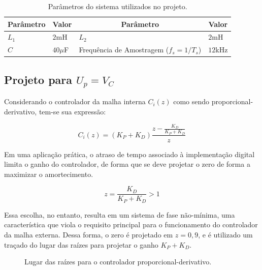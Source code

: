     \begin{table}[htb]
        \renewcommand{\arraystretch}{1.35}
        \setlength{\tabcolsep}{1.2mm}
        \caption{Parâmetros do sistema utilizados no projeto.}
        \label{tab:sim_parameters}
        \centering
        \begin{tabular}{l l l l}
            \hline
            \multicolumn{1}{c}{Parâmetro} & \multicolumn{1}{c}{Valor} &
            \multicolumn{1}{c}{Parâmetro} & \multicolumn{1}{c}{Valor} \\
            \hline
            $L_1$ &  $2$mH      &  $L_2$                                   &  $2$mH    \\
            $C$   &  $40\mu$F   & Frequência de Amostragem ($f_s = 1/T_s$) &  $12$kHz  \\
            \hline
        \end{tabular}
    \end{table}


\subsection{Projeto para $U_p = V_C$}

    Considerando o controlador da malha interna $C_i(z)$ como sendo proporcional-derivativo,
    tem-se sua expressão:

    \begin{equation}
        C_i(z) = \left( K_P + K_D \right) \frac{z- \frac{K_D}{K_P+K_D}}{z}
    \end{equation}

    Em uma aplicação prática, o atraso de tempo associado à implementação digital limita o
    ganho do controlador, de forma que se deve projetar o zero de forma a maximizar o amortecimento.

    \begin{equation*}
        z = \frac{K_D}{K_P+K_D} > 1
    \end{equation*}

    Essa escolha, no entanto, resulta em um sistema de fase não-mínima, uma característica
    que viola o requisito principal para o funcionamento do controlador da malha externa. Dessa
    forma, o zero é projetado em $z=0,9$, e é utilizado um traçado do lugar das raízes para projetar
    o ganho $K_P+K_D$.

    \begin{figure}[htb]
        \renewcommand\figurename{Fig.}
        \caption{Lugar das raízes para o controlador proporcional-derivativo.}
        \label{fig:rlocus_vc}
    \end{figure}

